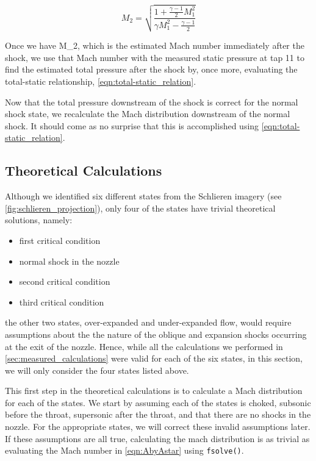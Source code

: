 \begin{equation} \label{eqn:normal_shock_eqn}
    M_2 = \sqrt{\frac{1 + \frac{\gamma - 1}{2}M_1^2}{\gamma M_1^2 - \frac{\gamma - 1}{2}}}
\end{equation}

Once we have \gls{M_2}, which is the estimated Mach number immediately after the shock, we use that Mach number with the measured static pressure at tap \num{11} to find the estimated total pressure after the shock by, once more, evaluating the total-static relationship, \autoref{eqn:total-static_relation}.

Now that the total pressure downstream of the shock is correct for the normal shock state, we recalculate the Mach distribution downstream of the normal shock. It should come as no surprise that this is accomplished using \autoref{eqn:total-static_relation}.

\subsection{Theoretical Calculations} \label{sec:theoretical_calculations}

Although we identified six different states from the Schlieren imagery (see \autoref{fig:schlieren_projection}), only four of the states have trivial theoretical solutions, namely:

\begin{itemize}
    \item first critical condition
    \item normal shock in the nozzle
    \item second critical condition
    \item third critical condition
\end{itemize}

\noindent{} the other two states, over-expanded and under-expanded flow, would require assumptions about the the nature of the oblique and expansion shocks occurring at the exit of the nozzle. Hence, while all the calculations we performed in \autoref{sec:measured_calculations} were valid for each of the six states, in this section, we will only consider the four states listed above.

This first step in the theoretical calculations is to calculate a Mach distribution for each of the states. We start by assuming each of the states is choked, subsonic before the throat, supersonic after the throat, and that there are no shocks in the nozzle. For the appropriate states, we will correct these invalid assumptions later. If these assumptions are all true, calculating the mach distribution is as trivial as evaluating the Mach number in \autoref{eqn:AbyAstar} using \verb|fsolve()|.

